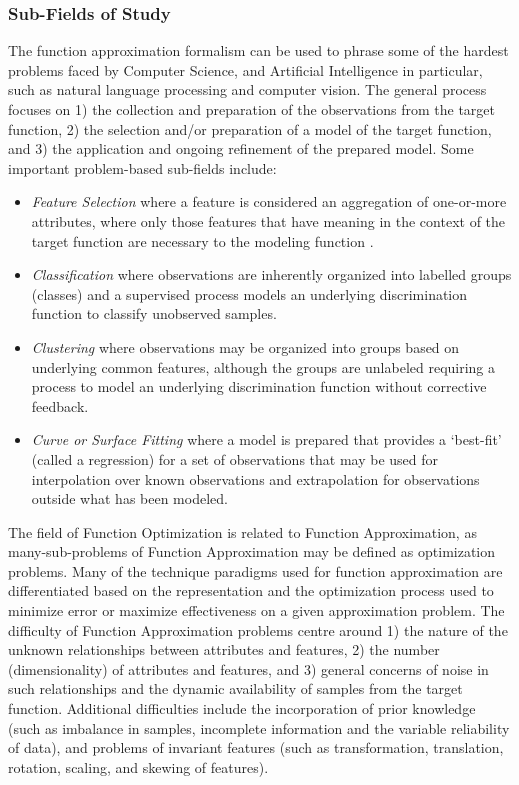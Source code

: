 \begin{bibunit}
\subsubsection{Sub-Fields of Study}
The function approximation formalism can be used to phrase some of the hardest problems faced by Computer Science, and Artificial Intelligence in particular, such as natural language processing and computer vision. 
The general process focuses on 1) the collection and preparation of the observations from the target function, 2) the selection and/or preparation of a model of the target function, and 3) the application and ongoing refinement of the prepared model. 
Some important problem-based sub-fields include: 
\begin{itemize}
	\item \emph{Feature Selection} where a feature is considered an aggregation of one-or-more attributes, where only those features that have meaning in the context of the target function are necessary to the modeling function \cite{Kudo2000, Guyon2003}.
	\item \emph{Classification} where observations are inherently organized into labelled groups (classes) and a supervised process models an underlying discrimination function to classify unobserved samples.
	\item \emph{Clustering} where observations may be organized into groups based on underlying common features, although the groups are unlabeled requiring a process to model an underlying discrimination function without corrective feedback.
	\item \emph{Curve or Surface Fitting} where a model is prepared that provides a `best-fit' (called a regression) for a set of observations that may be used for interpolation over known observations and extrapolation for observations outside what has been modeled.
\end{itemize}

The field of Function Optimization is related to Function Approximation, as many-sub-problems of Function Approximation may be defined as optimization problems. Many of the technique paradigms used for function approximation are differentiated based on the representation and the optimization process used to minimize error or maximize effectiveness on a given approximation problem. 
The difficulty of Function Approximation problems centre around 1) the nature of the unknown relationships between attributes and features, 2) the number (dimensionality) of attributes and features, and 3) general concerns of noise in such relationships and the dynamic availability of samples from the target function.
Additional difficulties include the incorporation of prior knowledge (such as imbalance in samples, incomplete information and the variable reliability of data), and problems of invariant features (such as transformation, translation, rotation, scaling, and skewing of features).



\end{bibunit}
